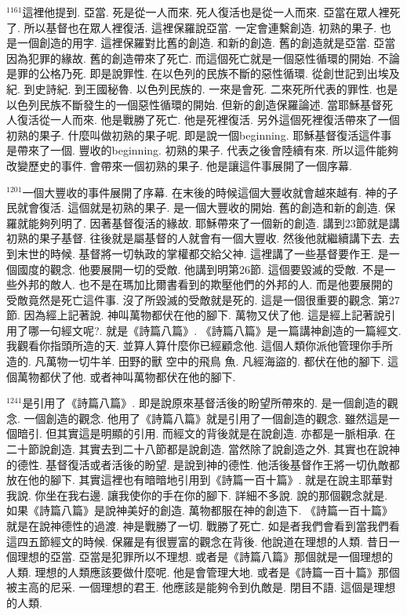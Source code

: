 \documentclass{book}
\begin{document}
$^{1161}$這裡他提到.
亞當.
死是從一人而來.
死人復活也是從一人而來.
亞當在眾人裡死了.
所以基督也在眾人裡復活.
這裡保羅說亞當.
一定會連繫創造.
初熟的果子.
也是一個創造的用字.
這裡保羅對比舊的創造.
和新的創造.
舊的創造就是亞當.
亞當因為犯罪的緣故.
舊的創造帶來了死亡.
而這個死亡就是一個惡性循環的開始.
不論是罪的公格乃死.
即是說罪性.
在以色列的民族不斷的惡性循環.
從創世記到出埃及紀.
到史詩紀.
到王國秘魯.
以色列民族的.
一來是會死.
二來死所代表的罪性.
也是以色列民族不斷發生的一個惡性循環的開始.
但新的創造保羅論述.
當耶穌基督死人復活從一人而來.
他是戰勝了死亡.
他是死裡復活.
另外這個死裡復活帶來了一個初熟的果子.
什麼叫做初熟的果子呢.
即是說一個beginning.
耶穌基督復活這件事是帶來了一個.
豐收的beginning.
初熟的果子.
代表之後會陸續有來.
所以這件能夠改變歷史的事件.
會帶來一個初熟的果子.
他是讓這件事展開了一個序幕.

$^{1201}$一個大豐收的事件展開了序幕.
在末後的時候這個大豐收就會越來越有.
神的子民就會復活.
這個就是初熟的果子.
是一個大豐收的開始.
舊的創造和新的創造.
保羅就能夠列明了.
因著基督復活的緣故.
耶穌帶來了一個新的創造.
講到23節就是講初熟的果子基督.
往後就是屬基督的人就會有一個大豐收.
然後他就繼續講下去.
去到末世的時候.
基督將一切執政的掌權都交給父神.
這裡講了一些基督要作王.
是一個國度的觀念.
他要展開一切的受敵.
他講到明第26節.
這個要毀滅的受敵.
不是一些外邦的敵人.
也不是在瑪加比爾書看到的欺壓他們的外邦的人.
而是他要展開的受敵竟然是死亡這件事.
沒了所毀滅的受敵就是死的.
這是一個很重要的觀念.
第27節.
因為經上記著說.
神叫萬物都伏在他的腳下.
萬物又伏了他.
這是經上記著說引用了哪一句經文呢?.
就是《詩篇八篇》.
《詩篇八篇》是一篇講神創造的一篇經文.
我觀看你指頭所造的天.
並算人算什麼你已經顧念他.
這個人類你派他管理你手所造的.
凡萬物一切牛羊.
田野的獸 空中的飛鳥 魚.
凡經海盜的.
都伏在他的腳下.
這個萬物都伏了他.
或者神叫萬物都伏在他的腳下.

$^{1241}$是引用了《詩篇八篇》.
即是說原來基督活後的盼望所帶來的.
是一個創造的觀念.
一個創造的觀念.
他用了《詩篇八篇》就是引用了一個創造的觀念.
雖然這是一個暗引.
但其實這是明顯的引用.
而經文的背後就是在說創造.
亦都是一脈相承.
在二十節說創造.
其實去到二十八節都是說創造.
當然除了說創造之外.
其實也在說神的德性.
基督復活或者活後的盼望.
是說到神的德性.
他活後基督作王將一切仇敵都放在他的腳下.
其實這裡也有暗暗地引用到《詩篇一百十篇》.
就是在說主耶華對我說.
你坐在我右邊.
讓我使你的手在你的腳下.
詳細不多說.
說的那個觀念就是.
如果《詩篇八篇》是說神美好的創造.
萬物都服在神的創造下.
《詩篇一百十篇》就是在說神德性的過渡.
神是戰勝了一切.
戰勝了死亡.
如是者我們會看到當我們看這四五節經文的時候.
保羅是有很豐富的觀念在背後.
他說道在理想的人類.
昔日一個理想的亞當.
亞當是犯罪所以不理想.
或者是《詩篇八篇》那個就是一個理想的人類.
理想的人類應該要做什麼呢.
他是會管理大地.
或者是《詩篇一百十篇》那個被主高的尼采.
一個理想的君王.
他應該是能夠令到仇敵是.
閉目不語.
這個是理想的人類.
\end{document}
